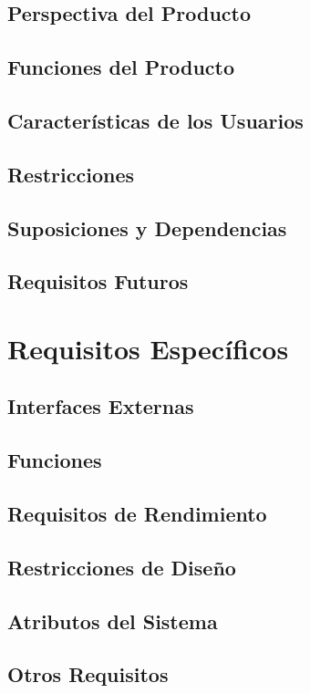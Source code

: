 \documentclass[12pt,a4paper]{article}
\begin{document}
\subsection{Perspectiva del Producto}
\subsection{Funciones del Producto}
\subsection{Características de los Usuarios}
\subsection{Restricciones}
\subsection{Suposiciones y Dependencias}
\subsection{Requisitos Futuros}
\section{Requisitos Específicos}
\subsection{Interfaces Externas}
\subsection{Funciones}
\subsection{Requisitos de Rendimiento}
\subsection{Restricciones de Diseño}
\subsection{Atributos del Sistema}
\subsection{Otros Requisitos}
\end{document}
